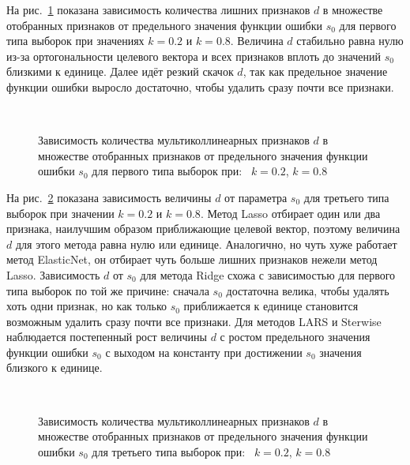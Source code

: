 \documentclass[a4paper,12pt]{article}
\theoremstyle{plain}
\begin{document}
На рис.~\ref{fig:d_s0_ortcol} показана зависимость количества лишних признаков $d$ в множестве отобранных признаков от предельного значения функции ошибки $s_0$ для первого типа выборок при значениях $k = 0.2$ и $k = 0.8$. Величина $d$ стабильно равна нулю из-за ортогональности целевого вектора и всех признаков вплоть до значений $s_0$ близкими к единице. Далее идёт резкий скачок $d$, так как предельное значение функции ошибки выросло достаточно, чтобы удалить сразу почти все признаки.  

\begin{figure}[!h]
\centering
{}
~
\caption{Зависимость количества мультиколлинеарных признаков $d$ в множестве отобранных признаков от предельного значения функции ошибки $s_0$ для первого типа выборок при:~ $k = 0.2$,  $k = 0.8$}
\label{fig:d_s0_ortcol}
\end{figure}

На рис.~\ref{fig:d_s0_coltarget} показана зависимость величины $d$ от параметра $s_0$ для третьего типа выборок при значении $k = 0.2$ и $k = 0.8$. Метод Lasso отбирает один или два признака, наилучшим образом приближающие целевой вектор, поэтому величина $d$ для этого метода равна нулю или единице. Аналогично, но чуть хуже работает метод ElasticNet, он отбирает чуть больше лишних признаков нежели метод Lasso. Зависимость $d$ от $s_0$ для метода Ridge схожа с зависимостью для первого типа выборок по той же причине: сначала $s_0$ достаточна велика, чтобы удалять хоть одни признак, но как только $s_0$ приближается к единице становится возможным удалить сразу почти все признаки. Для методов LARS и Sterwise наблюдается постепенный рост величины $d$ с ростом предельного значения функции ошибки $s_0$ с выходом на константу при достижении $s_0$ значения близкого к единице.   

\begin{figure}[!h]
\centering
{}
~
\caption{Зависимость количества мультиколлинеарных признаков $d$ в множестве отобранных признаков от предельного значения функции ошибки $s_0$ для третьего типа выборок при:~ $k = 0.2$,  $k = 0.8$}
\label{fig:d_s0_coltarget}
\end{figure}
\end{document}
